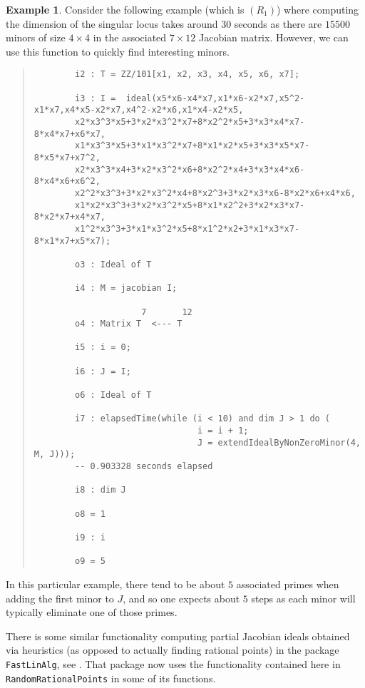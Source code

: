 \documentclass[11pt]{amsart}
\theoremstyle{definition}
\newtheorem{example}{Example}[section]
\begin{document}
\begin{example}
    Consider the following example (which is $(R_1)$) where computing the dimension of the singular locus takes around $30$ seconds as there are $15500$ minors of size $4 \times 4$ in the associated $7 \times 12$ Jacobian matrix.  However, we can use this function to quickly find interesting minors.
  {{\small\color{blue}
  \begin{quote}
\begin{verbatim}
		i2 : T = ZZ/101[x1, x2, x3, x4, x5, x6, x7];
		
		i3 : I =  ideal(x5*x6-x4*x7,x1*x6-x2*x7,x5^2-x1*x7,x4*x5-x2*x7,x4^2-x2*x6,x1*x4-x2*x5,
		x2*x3^3*x5+3*x2*x3^2*x7+8*x2^2*x5+3*x3*x4*x7-8*x4*x7+x6*x7,
		x1*x3^3*x5+3*x1*x3^2*x7+8*x1*x2*x5+3*x3*x5*x7-8*x5*x7+x7^2,
		x2*x3^3*x4+3*x2*x3^2*x6+8*x2^2*x4+3*x3*x4*x6-8*x4*x6+x6^2,
		x2^2*x3^3+3*x2*x3^2*x4+8*x2^3+3*x2*x3*x6-8*x2*x6+x4*x6,
		x1*x2*x3^3+3*x2*x3^2*x5+8*x1*x2^2+3*x2*x3*x7-8*x2*x7+x4*x7,
		x1^2*x3^3+3*x1*x3^2*x5+8*x1^2*x2+3*x1*x3*x7-8*x1*x7+x5*x7);
		
		o3 : Ideal of T
		
		i4 : M = jacobian I;
		
		             7       12
		o4 : Matrix T  <--- T
		
		i5 : i = 0;
		
		i6 : J = I;
		
		o6 : Ideal of T
		
		i7 : elapsedTime(while (i < 10) and dim J > 1 do (
                                i = i + 1; 
                                J = extendIdealByNonZeroMinor(4, M, J)));
		-- 0.903328 seconds elapsed
		
		i8 : dim J
		
		o8 = 1
		
		i9 : i
		
		o9 = 5
\end{verbatim}
\end{quote}
    }}    
    \noindent
    In this particular example, there tend to be about $5$ associated primes when adding the first minor to $J$, and so one expects about $5$ steps as each minor will typically eliminate one of those primes.
\end{example} 

There is some similar functionality computing partial Jacobian ideals obtained via heuristics (as opposed to actually finding rational points) in the package {\tt FastLinAlg}, see \cite{FastLinAlgSource}.  That package now uses the functionality contained here in {\tt RandomRationalPoints} in some of its functions.





\vspace{1em}
\end{document}
